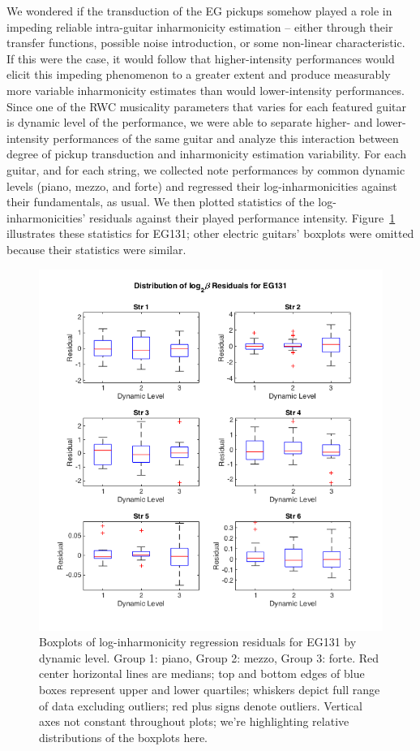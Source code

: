 \documentclass[12pt]{cmuthesis}
\begin{document}
We wondered if the transduction of the EG pickups somehow played a role in impeding reliable intra-guitar inharmonicity estimation -- either through their transfer functions, possible noise introduction, or some non-linear characteristic. If this were the case, it would follow that higher-intensity performances would elicit this impeding phenomenon to a greater extent and produce measurably more variable inharmonicity estimates than would lower-intensity performances. Since one of the RWC musicality parameters that varies for each featured guitar is dynamic level of the performance, we were able to separate higher- and lower-intensity performances of the same guitar and analyze this interaction between degree of pickup transduction and inharmonicity estimation variability. For each guitar, and for each string, we collected note performances by common dynamic levels (piano, mezzo, and forte) and regressed their log-inharmonicities against their fundamentals, as usual. We then plotted statistics of the log-inharmonicities' residuals against their played performance intensity. Figure~\ref{fig:eg1-string-dyn} illustrates these statistics for EG131; other electric guitars' boxplots were omitted because their statistics were similar.
\begin{figure}[!htbp] 
\centering
\includegraphics[scale=0.75]{eg1-string-dyn}
\caption{Boxplots of log-inharmonicity regression residuals for EG131 by dynamic level. Group 1: piano, Group 2: mezzo, Group 3: forte. Red center horizontal lines are medians; top and bottom edges of blue boxes represent upper and lower quartiles; whiskers depict full range of data excluding outliers; red plus signs denote outliers. Vertical axes not constant throughout plots; we're highlighting relative distributions of the boxplots here.}
\label{fig:eg1-string-dyn}
\end{figure} 
\end{document}
